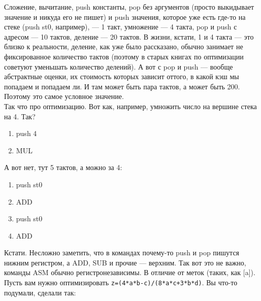 \documentclass{article}
\begin{document}
    Сложение, вычитание, push константы, pop без аргументов (просто выкидывает значение и никуда его не пишет) и push значения, которое уже есть где-то на стеке (push st0, например), --- 1 такт, умножение --- 4 такта, pop и push с адресом --- 10 тактов, деление --- 20 тактов. В жизни, кстати, 1 и 4 такта --- это близко к реальности, деление, как уже было рассказано, обычно занимает не фиксированное количество тактов (поэтому в старых книгах по оптимизации советуют уменьшать количество делений). А вот с pop и push --- вообще абстрактные оценки, их стоимость которых зависит оттого, в какой кэш мы попадаем и попадаем ли. И там может быть пара тактов, а может быть 200. Поэтому это самое условное значение.\\
    Так что про оптимизацию. Вот как, например, умножить число на вершине стека на 4. Так?
    \begin{enumerate}
        \item push 4
        \item MUL
    \end{enumerate}
    А вот нет, тут 5 тактов, а можно за 4:
    \begin{enumerate}
        \item push st0
        \item ADD
        \item push st0
        \item ADD
    \end{enumerate}
    Кстати. Несложно заметить, что в командах почему-то push и pop пишутся нижним регистром, а ADD, SUB и прочие --- верхним. Так вот это не важно, команды ASM обычно регистронезависимы. В отличие от меток (таких, как [a]).\\
    Пусть вам нужно оптимизировать \texttt{z=(4*a*b-c)/(8*a*c+3*b*d)}. Вы что-то подумали, сделали так:
\end{document}
